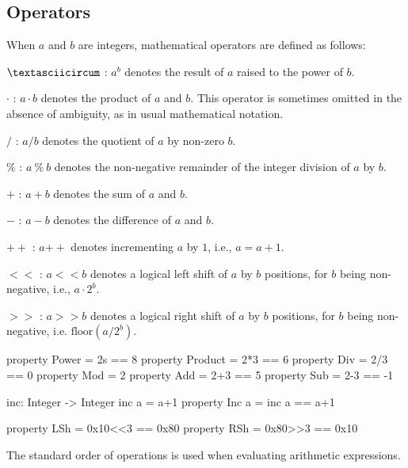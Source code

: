 \subsection{Operators}
When $a$ and $b$ are integers, mathematical operators are defined as
follows:
\begin{description}
 \item $\textasciicircum$ : $a ^ b$ denotes the result of $a$ raised to the power of $b$.
 \item $\cdot$ : $a \cdot b$ denotes the product of $a$ and $b$.  This operator is
      sometimes omitted in the absence of ambiguity, as in usual
      mathematical notation.

 \item $/$ : $a / b$ denotes the quotient of $a$ by non-zero $b$.

 \item $\%$ : $a\ \%\ b$ denotes the non-negative remainder of the integer
      division of $a$ by $b$.

 \item $+$ : $a + b$ denotes the sum of $a$ and $b$.

 \item $-$ : $a - b$ denotes the difference of $a$ and $b$.

 \item $++$ : $a{++}$ denotes incrementing $a$ by $1$, i.e., $a = a + 1$.

 \item $<<$ : $a << b$ denotes a logical left shift of $a$ by $b$ positions, for $b$  being non-negative, 
 i.e., $a \cdot 2^b$.

 \item $>>$ : $a >> b$ denotes a logical right shift of $a$ by $b$ positions, for $b$ being non-negative, 
 i.e. $\textrm{floor}(a / 2^b)$.
\end{description}

\begin{code}
  property Power = 2^^3 == 8
  property Product = 2*3 == 6
  property Div = 2/3 == 0
  property Mod = 2%
  property Add = 2+3 == 5
  property Sub = 2-3 == -1

  inc: Integer -> Integer
  inc a = a+1
  property Inc a = inc a == a+1

  property LSh = 0x10<<3 == 0x80
  property RSh = 0x80>>3 == 0x10
\end{code}

   The standard order of operations is used when evaluating arithmetic
   expressions.
   \\

